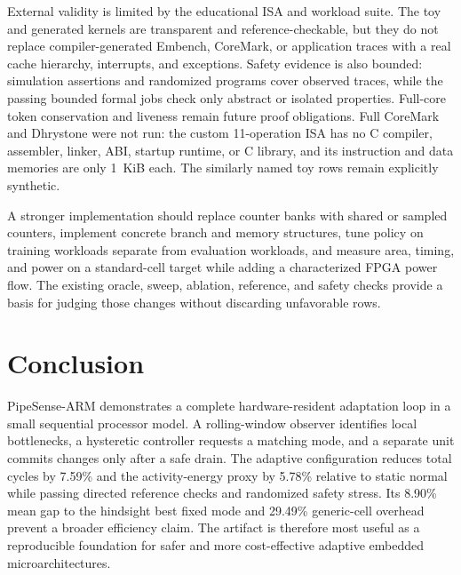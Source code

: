 \documentclass[conference]{IEEEtran}
\newcommand{\pipesense}{PipeSense-ARM}
\begin{document}
External validity is limited by the educational ISA and workload suite. The
toy and generated kernels are transparent and reference-checkable, but they do
not replace compiler-generated Embench, CoreMark, or application traces with a
real cache hierarchy, interrupts, and exceptions. Safety evidence is also
bounded: simulation assertions and randomized programs cover observed traces,
while the passing bounded formal jobs check only abstract or isolated
properties. Full-core token conservation and liveness remain future proof
obligations. Full CoreMark and Dhrystone were not run: the custom 11-operation
ISA has no C compiler, assembler, linker, ABI, startup runtime, or C library,
and its instruction and data memories are only 1~KiB each. The similarly named
toy rows remain explicitly synthetic.

A stronger implementation should replace counter banks with shared or sampled
counters, implement concrete branch and memory structures, tune policy on
training workloads separate from evaluation workloads, and measure area,
timing, and power on a standard-cell target while adding a characterized FPGA
power flow. The existing oracle,
sweep, ablation, reference, and safety checks provide a basis for judging those
changes without discarding unfavorable rows.

\section{Conclusion}

\pipesense{} demonstrates a complete hardware-resident adaptation loop in a
small sequential processor model. A rolling-window observer identifies local
bottlenecks, a hysteretic controller requests a matching mode, and a separate
unit commits changes only after a safe drain. The adaptive configuration
reduces total cycles by 7.59\% and the activity-energy proxy by 5.78\% relative
to static normal while passing directed reference checks and randomized safety
stress. Its 8.90\% mean gap to the hindsight best fixed mode and 29.49\%
generic-cell overhead prevent a broader efficiency claim. The artifact is
therefore most useful as a reproducible foundation for safer and more
cost-effective adaptive embedded microarchitectures.



\end{document}
